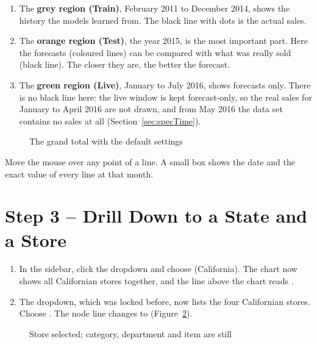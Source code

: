 \begin{enumerate}
  \item The \textbf{grey region (Train)}, February 2011 to December 2014, shows the history the models learned from. The black line with dots is the actual sales.
  \item The \textbf{orange region (Test)}, the year 2015, is the most important part. Here the forecasts (coloured lines) can be compared with what was really sold (black line). The closer they are, the better the forecast.
  \item The \textbf{green region (Live)}, January to July 2016, shows forecasts only. There is no black line here: the live window is kept forecast-only, so the real sales for January to April 2016 are not drawn, and from May 2016 the data set contains no sales at all (Section~\ref{sec:specTime}).
\end{enumerate}

\begin{figure}[H]
  \centering
  \caption{The grand total with the default settings}
  \label{fig:fsTotal}
\end{figure}

\begin{TipBox}
Move the mouse over any point of a line. A small box shows the date and the exact value of every line at that month.
\end{TipBox}

\section{Step 3 -- Drill Down to a State and a Store}
\label{sec:fsDrill}

\begin{enumerate}
  \item In the sidebar, click the  dropdown and choose  (California). The chart now shows all Californian stores together, and the line above the chart reads .
  \item The  dropdown, which was locked before, now lists the four Californian stores. Choose . The node line changes to  (Figure~\ref{fig:fsStore}).
\end{enumerate}

\begin{figure}[H]
  \centering
  \caption{Store  selected; category, department and item are still }
  \label{fig:fsStore}
\end{figure}

